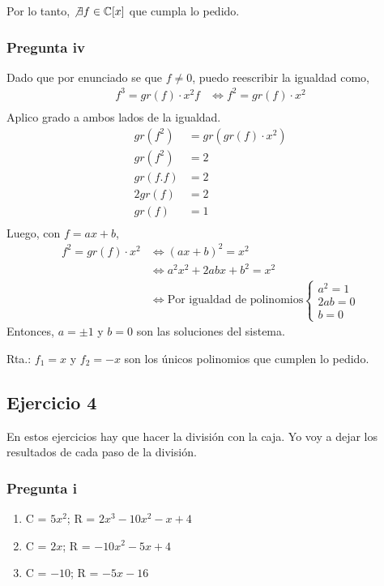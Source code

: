 Por lo tanto, $ \not \exists f \in \mathbb{C}[x] $ que cumpla lo pedido.

\subsubsection{Pregunta iv}

Dado que por enunciado se que $ f \neq 0 $, puedo reescribir la igualdad como,
\begin{align*}
    f^3 = gr(f) \cdot x^2f &\iff f^2 = gr(f)\cdot x^2 \\
\end{align*}
Aplico grado a ambos lados de la igualdad.
\begin{align*}
    gr(f^2) &= gr(gr(f)\cdot x^2) \\
    gr(f^2) &= 2 \\
    gr(f.f) &= 2 \\
    2gr(f) &= 2 \\
    gr(f) &= 1 \\
\end{align*}
Luego, con $ f = ax+b $,
\begin{align*}
    f^2 = gr(f)\cdot x^2 &\iff (ax+b)^2 = x^2 \\
    &\iff a^2x^2 + 2abx + b^2 = x^2 \\
    &\iff \text{Por igualdad de polinomios} \begin{cases}
        a^2 = 1 \\
        2ab = 0 \\
        b = 0
    \end{cases}
\end{align*}
Entonces, $ a = \pm 1 $ y $ b = 0 $ son las soluciones del sistema.

Rta.: $ f_1 = x $ y  $ f_2 = -x $ son los únicos polinomios que cumplen lo pedido.

\subsection{Ejercicio 4}

En estos ejercicios hay que hacer la división con la caja. Yo voy a dejar los resultados de cada paso de la división.

\subsubsection{Pregunta i}

\begin{enumerate}
    \item C = $ 5x^2 $; R = $ 2x^3-10x^2-x+4 $ 
    \item C = $ 2x $; R = $ -10x^2-5x+4 $ 
    \item C = $ -10 $; R = $ -5x-16 $ 
\end{enumerate}

